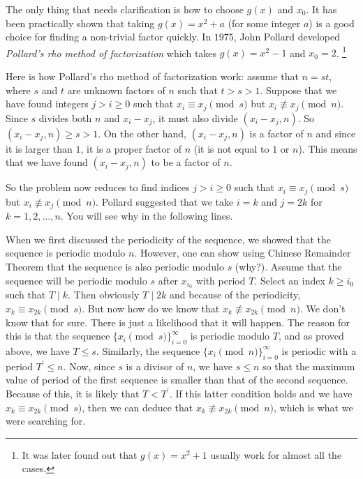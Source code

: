 \documentclass{subfiles}
\begin{document}
	The only thing that needs clarification is how to choose $g(x)$ and $x_0$. It has been practically shown that taking $g(x)=x^2+a$ (for some integer $a$) is a good choice for finding a non-trivial factor quickly.
	In $1975$, John Pollard developed \emph{Pollard's rho method of factorization} which takes $g(x)=x^2-1$ and $x_0=2$. \footnote{It was later found out that $g(x)=x^2+1$ usually work for almost all the cases.}

	Here is how Pollard's rho method of factorization work: assume that $n=st$, where $s$ and $t$ are unknown factors of $n$ such that $t>s>1$. Suppose that we have found integers $j>i\geq 0$ such that $x_i \equiv x_j \pmod s$ but $x_i \not \equiv x_j \pmod n$. Since $s$ divides both $n$ and $x_i-x_j$, it must also divide $(x_i-x_j, n)$. So $(x_i-x_j, n) \geq s >1$. On the other hand, $(x_i-x_j, n)$ is a factor of $n$ and since it is larger than $1$, it is a proper factor of $n$ (it is not equal to $1$ or $n$). This means that we have found $(x_i-x_j, n)$ to be a factor of $n$.

	So the problem now reduces to find indices $j>i \geq 0$ such that $x_i \equiv x_j \pmod s$ but $x_i \not \equiv x_j \pmod n$. Pollard suggested that we take $i=k$ and $j=2k$ for $k=1,2,\ldots, n$. You will see why in the following lines.

	When we first discussed the periodicity of the sequence, we showed that the sequence is periodic modulo $n$. However, one can show using Chinese Remainder Theorem that the sequence is also periodic modulo $s$ (why?). Assume that the sequence will be periodic modulo $s$ after $x_{i_0}$ with period $T$. Select an index $k \geq i_0$ such that $T\mid k$. Then obviously $T\mid 2k$ and because of the periodicity, $x_{k} \equiv x_{2k} \pmod s$. But now how do we know that $x_{k} \not \equiv x_{2k} \pmod n$. We don't know that for sure. There is just a likelihood that it will happen. The reason for this is that the sequence $\{x_i \pmod s\}_{i=0}^{\infty}$ is periodic modulo $T$, and as proved above, we have $T \leq s$. Similarly, the sequence $\{x_i \pmod n\}_{i=0}^{\infty}$ is periodic with a period $T^{\prime} \leq n$. Now, since $s$ is a divisor of $n$, we have $s \leq n$ so that the maximum value of period of the first sequence is smaller than that of the second sequence. Because of this, it is likely that $T<T^{\prime}$. If this latter condition holds and we have $x_{k}\equiv x_{2k} \pmod s$, then we can deduce that $x_k \not \equiv x_{2k} \pmod n$, which is what we were searching for.
\end{document}
